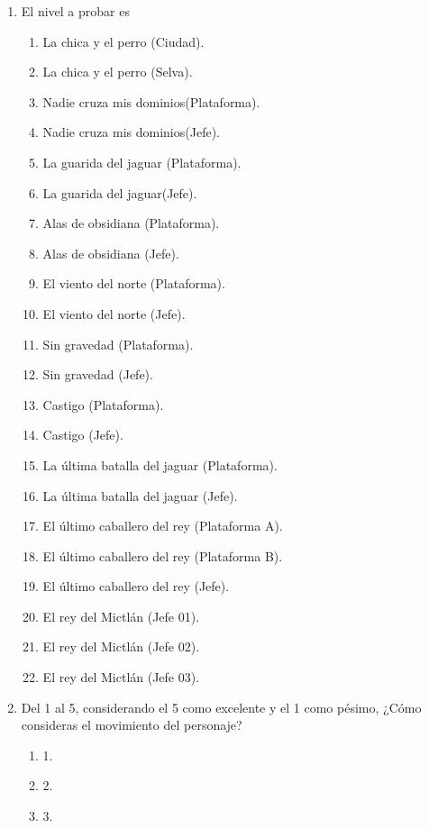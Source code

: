 \begin{enumerate}
    \item El nivel a probar es
        \begin{enumerate}
            \item La chica y el perro (Ciudad).
            \item La chica y el perro (Selva).
            \item Nadie cruza mis dominios(Plataforma).
            \item Nadie cruza mis dominios(Jefe).
            \item La guarida del jaguar (Plataforma).
            \item La guarida del jaguar(Jefe).
            \item Alas de obsidiana (Plataforma).
            \item Alas de obsidiana (Jefe).
            \item El viento del norte (Plataforma).
            \item El viento del norte (Jefe).
            \item Sin gravedad (Plataforma).
            \item Sin gravedad (Jefe).
            \item Castigo (Plataforma).
            \item Castigo (Jefe).
            \item La última batalla del jaguar (Plataforma).
            \item La última batalla del jaguar (Jefe).
            \item El último caballero del rey (Plataforma A).
            \item El último caballero del rey (Plataforma B).
            \item El último caballero del rey (Jefe).
            \item El rey del Mictlán (Jefe 01).
            \item El rey del Mictlán (Jefe 02).
            \item El rey del Mictlán (Jefe 03).
        \end{enumerate}
    \item Del 1 al 5, considerando el 5 como excelente y el 1 como pésimo,
    ¿Cómo consideras el movimiento del personaje?
        \begin{enumerate}
            \item 1.
            \item 2.
            \item 3.

\end{enumerate}
\end{enumerate}
